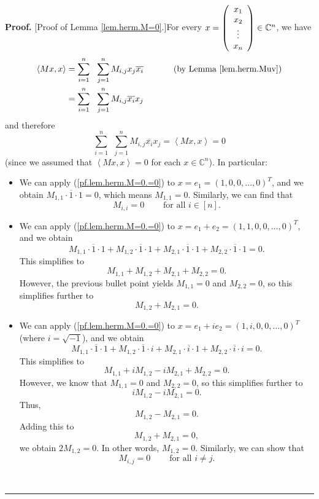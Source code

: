\documentclass[numbers=enddot,12pt,final,onecolumn,notitlepage]{scrartcl}%
\numberwithin{exer}{subsection}
\theoremstyle{definition}
\newenvironment{proof}[1][Proof]{\noindent\textbf{#1.} }{\ \rule{0.5em}{0.5em}}
\let\sumnonlimits\sum
\renewcommand{\sum}{\sumnonlimits\limits}
\begin{document}
\begin{proof}
[Proof of Lemma \ref{lem.herm.M=0}.]For every $x=\left(
\begin{array}
[c]{c}%
x_{1}\\
x_{2}\\
\vdots\\
x_{n}%
\end{array}
\right)  \in\mathbb{C}^{n}$, we have%
\begin{align*}
\left\langle Mx,x\right\rangle  &  =\sum_{i=1}^{n}\ \ \sum_{j=1}^{n}%
M_{i,j}x_{j}\overline{x_{i}}\ \ \ \ \ \ \ \ \ \ \left(  \text{by Lemma
\ref{lem.herm.Muv}}\right) \\
&  =\sum_{i=1}^{n}\ \ \sum_{j=1}^{n}M_{i,j}\overline{x_{i}}x_{j}%
\end{align*}
and therefore%
\begin{equation}
\sum_{i=1}^{n}\ \ \sum_{j=1}^{n}M_{i,j}\overline{x_{i}}x_{j}=\left\langle
Mx,x\right\rangle =0 \label{pf.lem.herm.M=0.=0}%
\end{equation}
(since we assumed that $\left\langle Mx,x\right\rangle =0$ for each
$x\in\mathbb{C}^{n}$). In particular:

\begin{itemize}
\item We can apply (\ref{pf.lem.herm.M=0.=0}) to $x=e_{1}=\left(
1,0,0,\ldots,0\right)  ^{T}$, and we obtain $M_{1,1}\cdot\overline{1}\cdot
1=0$, which means $M_{1,1}=0$. Similarly, we can find that%
\begin{equation}
M_{i,i}=0\ \ \ \ \ \ \ \ \ \ \text{for all }i\in\left[  n\right]  .
\label{pf.lem.herm.M=0.Mii=0}%
\end{equation}


\item We can apply (\ref{pf.lem.herm.M=0.=0}) to $x=e_{1}+e_{2}=\left(
1,1,0,0,\ldots,0\right)  ^{T}$, and we obtain
\[
M_{1,1}\cdot\overline{1}\cdot1+M_{1,2}\cdot\overline{1}\cdot1+M_{2,1}%
\cdot\overline{1}\cdot1+M_{2,2}\cdot\overline{1}\cdot1=0.
\]
This simplifies to%
\[
M_{1,1}+M_{1,2}+M_{2,1}+M_{2,2}=0.
\]
However, the previous bullet point yields $M_{1,1}=0$ and $M_{2,2}=0$, so this
simplifies further to%
\[
M_{1,2}+M_{2,1}=0.
\]


\item We can apply (\ref{pf.lem.herm.M=0.=0}) to $x=e_{1}+ie_{2}=\left(
1,i,0,0,\ldots,0\right)  ^{T}$ (where $i=\sqrt{-1}$), and we obtain
\[
M_{1,1}\cdot\overline{1}\cdot1+M_{1,2}\cdot\overline{1}\cdot i+M_{2,1}%
\cdot\overline{i}\cdot1+M_{2,2}\cdot\overline{i}\cdot i=0.
\]
This simplifies to%
\[
M_{1,1}+iM_{1,2}-iM_{2,1}+M_{2,2}=0.
\]
However, we know that $M_{1,1}=0$ and $M_{2,2}=0$, so this simplifies further
to%
\[
iM_{1,2}-iM_{2,1}=0.
\]
Thus,
\[
M_{1,2}-M_{2,1}=0.
\]
Adding this to%
\[
M_{1,2}+M_{2,1}=0,
\]
we obtain $2M_{1,2}=0$. In other words, $M_{1,2}=0$. Similarly, we can show
that%
\begin{equation}
M_{i,j}=0\ \ \ \ \ \ \ \ \ \ \text{for all }i\neq
j.\label{pf.lem.herm.M=0.Mij=0}%
\end{equation}


\end{itemize}
\end{proof}
\end{document}
